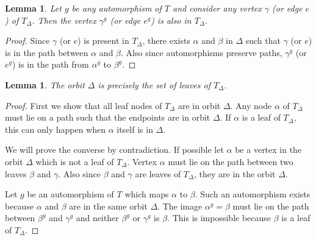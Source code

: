 \documentclass[a4paper,11pt]{article}
\newtheorem{lemma}[theorem]{Lemma}
\begin{document}
\begin{lemma}
  Let $g$ be any automorphism of $T$ and consider any vertex $\gamma$
  (or edge $e$) of $T_\Delta$. Then the vertex $\gamma^g$ (or edge
  $e^g$) is also in $T_\Delta$.
\end{lemma}
\begin{proof}
  Since $\gamma$ (or $e$) is present in $T_\Delta$, there exists
  $\alpha$ and $\beta$ in $\Delta$ such that $\gamma$ (or $e$) is in
  the path between $\alpha$ and $\beta$. Also since automorphisms
  preserve paths, $\gamma^g$ (or $e^g$) is in the path from
  $\alpha^g$ to $\beta^g$.
\end{proof}

\begin{lemma}\label{lemleaf}
  The orbit $\Delta$ is precisely the set of leaves of $T_{\Delta}$.
\end{lemma}
\begin{proof}
  First we show that all leaf nodes of $T_{\Delta}$ are in orbit
  $\Delta$. Any node $\alpha$ of $T_{\Delta}$ must lie on a path such
  that the endpoints are in orbit $\Delta$. If $\alpha$ is a leaf of
  $T_{\Delta}$, this can only happen when $\alpha$ itself is in
  $\Delta$.

  We will prove the converse by contradiction. If possible let
  $\alpha$ be a vertex in the orbit $\Delta$ which is not a leaf of
  $T_{\Delta}$. Vertex $\alpha$ must lie on the path between two
  leaves $\beta$ and $\gamma$. Also since $\beta$ and $\gamma$ are
  leaves of $T_\Delta$, they are in the orbit $\Delta$.

  Let $g$ be an automorphism of $T$ which maps $\alpha$ to $\beta$.
  Such an automorphism exists because $\alpha$ and $\beta$ are in the
  same orbit $\Delta$. The image $\alpha^g=\beta$ must lie on the path
  between $\beta^g$ and $\gamma^g$ and neither $\beta^g$ or $\gamma^g$
  is $\beta$. This is impossible because $\beta$ is a leaf of
  $T_\Delta$. 
\end{proof}
\end{document}
